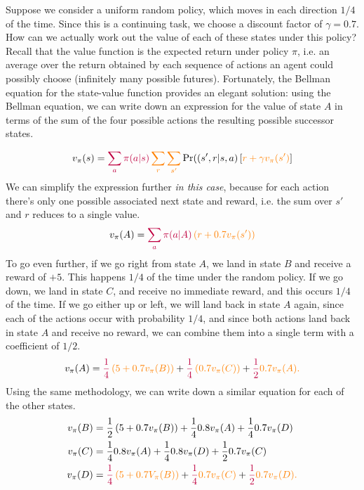 \documentclass[12pt]{article}
\begin{document}
Suppose we consider a uniform random policy, which moves in each direction $1/4$ of the time. Since this is a continuing task, we choose a discount factor of $\gamma = 0.7$. How can we actually work out the value of each of these states under this policy?  Recall that the value function is the expected return under policy $\pi$, i.e. an average over the return obtained by each sequence of actions an agent could possibly choose (infinitely many possible futures). Fortunately, the Bellman equation for the state-value function provides an elegant solution: using the Bellman equation, we can write down an expression for the value of state $A$ in terms of the sum of the four possible actions the resulting possible successor states.

\begin{equation*}
  v_\pi(s) = \color{purple} \sum_a \pi(a|s) \color{orange} \sum_r \sum_{s'} \color{black} \Pr(\left(s', r|s,a\right) \left[ \color{orange} r + \gamma v_\pi(s') \color{black} \right]
\end{equation*}
We can simplify the expression further \emph{in this case}, because for each action there's only one possible associated next state and reward,
i.e. the sum over $s'$ and $r$ reduces to a single value.
\[
v_\pi(A) = \color{purple} \sum_a \pi(a|A) \color{orange} \left(r + 0.7 v_\pi(s')\right)
\]
To go even further, if we go right from state $A$, we land in state $B$ and receive a reward of $+5$. This happens $1/4$ of the time under the random policy. If we go down, we land in state $C$, and receive no immediate reward, and this occurs $1/4$ of the time. If we go either up or left, we will land back in state $A$ again, since each of the actions occur with probability $1/4$, and since both actions land back in state $A$ and receive no reward, we can combine them into a single term with a coefficient of $1/2$.
\[
  v_\pi(A) = \color{purple} \frac{1}{4} \color{orange} \left(5 + 0.7 v_\pi(B)\right) \color{black} + \color{purple} \frac{1}{4} \color{orange} \left(0.7 v_\pi(C)\right) \color{black} + \color{purple} \frac{1}{2} \color{orange} 0.7 v_\pi(A).
\]
Using the same methodology, we can write down a similar equation for each of the other states.
\begin{align*}
  v_\pi(B) &= \frac{1}{2} \left(5 + 0.7 v_\pi(B)\right) + \frac{1}{4} 0.8              v_\pi(A) + \frac{1}{4} 0.7 v_\pi (D) \\
  v_\pi(C) &= \frac{1}{4} 0.8 v_\pi(A) + \frac{1}{4} 0.8 v_\pi(D) + \frac{1}{2}              0.7 v_\pi(C) \\
  v_\pi(D) &= \color{purple} \frac{1}{4} \color{orange} \left(5 + 0.7 V_\pi(B)\right) \color{black} + \color{purple} \frac{1}{4} \color{orange} 0.7 v_\pi(C) \color{black} + \color{purple} \frac{1}{2} \color{orange} 0.7 v_\pi(D).
\end{align*}
\end{document}
